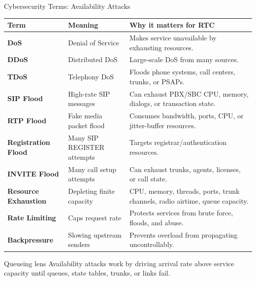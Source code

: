 \documentclass[aspectratio=169]{beamer}
\begin{document}
\begin{frame}{Cybersecurity Terms: Availability Attacks}
\tiny
\begin{tabular}{p{2.2cm} p{3.5cm} p{6.5cm}}
\toprule
\textbf{Term} & \textbf{Meaning} & \textbf{Why it matters for RTC} \\
\midrule
\textbf{DoS} & Denial of Service & Makes service unavailable by exhausting resources. \\
\textbf{DDoS} & Distributed DoS & Large-scale DoS from many sources. \\
\textbf{TDoS} & Telephony DoS & Floods phone systems, call centers, trunks, or PSAPs. \\
\textbf{SIP Flood} & High-rate SIP messages & Can exhaust PBX/SBC CPU, memory, dialogs, or transaction state. \\
\textbf{RTP Flood} & Fake media packet flood & Consumes bandwidth, ports, CPU, or jitter-buffer resources. \\
\textbf{Registration Flood} & Many SIP REGISTER attempts & Targets registrar/authentication resources. \\
\textbf{INVITE Flood} & Many call setup attempts & Can exhaust trunks, agents, licenses, or call state. \\
\textbf{Resource Exhaustion} & Depleting finite capacity & CPU, memory, threads, ports, trunk channels, radio airtime, queue capacity. \\
\textbf{Rate Limiting} & Caps request rate & Protects services from brute force, floods, and abuse. \\
\textbf{Backpressure} & Slowing upstream senders & Prevents overload from propagating uncontrollably. \\
\bottomrule
\end{tabular}

\vspace{0.15cm}
\begin{block}{Queueing lens}
Availability attacks work by driving arrival rate above service capacity until queues, state tables, trunks, or links fail.
\end{block}
\end{frame}
\end{document}
